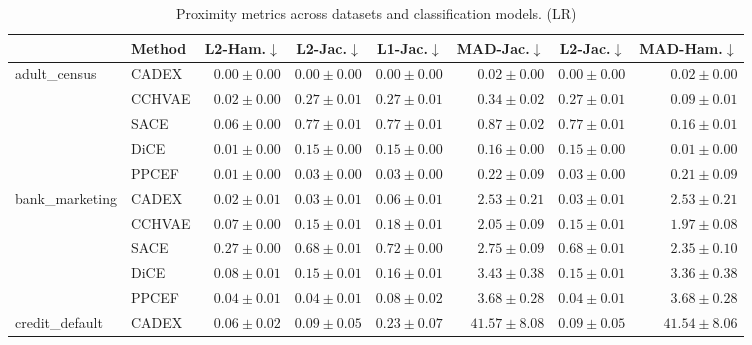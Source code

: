 \begin{table}[ht]
\centering
\caption{Proximity metrics across datasets and classification models. (LR)}
\label{tab:proximity_metrics_multinomiallogisticregression}
\begin{center}
\begin{sc}
\begin{scriptsize}
\begin{tabular}{l|l|rrrrrr}
\toprule
 & Method & L2-Ham.$\downarrow$ & L2-Jac.$\downarrow$ & L1-Jac.$\downarrow$ & MAD-Jac.$\downarrow$ & L2-Jac.$\downarrow$ & MAD-Ham.$\downarrow$ \\
\midrule
\multirow{5}{*}{adult\_census} & CADEX & $\boldsymbol{0.00\pm{0.00}}$ & $\boldsymbol{0.00\pm{0.00}}$ & $\boldsymbol{0.00\pm{0.00}}$ & $\boldsymbol{0.02\pm{0.00}}$ & $\boldsymbol{0.00\pm{0.00}}$ & $0.02\pm{0.00}$ \\
 & CCHVAE & $0.02\pm{0.00}$ & $0.27\pm{0.01}$ & $0.27\pm{0.01}$ & $0.34\pm{0.02}$ & $0.27\pm{0.01}$ & $0.09\pm{0.01}$ \\
 & SACE & $0.06\pm{0.00}$ & $0.77\pm{0.01}$ & $0.77\pm{0.01}$ & $0.87\pm{0.02}$ & $0.77\pm{0.01}$ & $0.16\pm{0.01}$ \\
 & DiCE & $0.01\pm{0.00}$ & $0.15\pm{0.00}$ & $0.15\pm{0.00}$ & $0.16\pm{0.00}$ & $0.15\pm{0.00}$ & $\boldsymbol{0.01\pm{0.00}}$ \\
 & PPCEF & $0.01\pm{0.00}$ & $0.03\pm{0.00}$ & $0.03\pm{0.00}$ & $0.22\pm{0.09}$ & $0.03\pm{0.00}$ & $0.21\pm{0.09}$ \\
\midrule
\multirow{5}{*}{bank\_marketing} & CADEX & $\boldsymbol{0.02\pm{0.01}}$ & $\boldsymbol{0.03\pm{0.01}}$ & $\boldsymbol{0.06\pm{0.01}}$ & $2.53\pm{0.21}$ & $\boldsymbol{0.03\pm{0.01}}$ & $2.53\pm{0.21}$ \\
 & CCHVAE & $0.07\pm{0.00}$ & $0.15\pm{0.01}$ & $0.18\pm{0.01}$ & $\boldsymbol{2.05\pm{0.09}}$ & $0.15\pm{0.01}$ & $\boldsymbol{1.97\pm{0.08}}$ \\
 & SACE & $0.27\pm{0.00}$ & $0.68\pm{0.01}$ & $0.72\pm{0.00}$ & $2.75\pm{0.09}$ & $0.68\pm{0.01}$ & $2.35\pm{0.10}$ \\
 & DiCE & $0.08\pm{0.01}$ & $0.15\pm{0.01}$ & $0.16\pm{0.01}$ & $3.43\pm{0.38}$ & $0.15\pm{0.01}$ & $3.36\pm{0.38}$ \\
 & PPCEF & $0.04\pm{0.01}$ & $0.04\pm{0.01}$ & $0.08\pm{0.02}$ & $3.68\pm{0.28}$ & $0.04\pm{0.01}$ & $3.68\pm{0.28}$ \\
\midrule
\multirow{5}{*}{credit\_default} & CADEX & $\boldsymbol{0.06\pm{0.02}}$ & $\boldsymbol{0.09\pm{0.05}}$ & $0.23\pm{0.07}$ & $41.57\pm{8.08}$ & $\boldsymbol{0.09\pm{0.05}}$ & $41.54\pm{8.06}$ \\

\end{tabular}
\end{scriptsize}
\end{sc}
\end{center}
\end{table}
